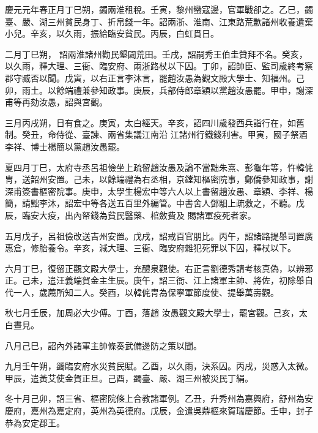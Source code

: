 \begin{pinyinscope}
 慶元元年春正月丁巳朔，蠲兩淮租稅。壬寅，黎州蠻寇邊，官軍戰卻之。乙巳，蠲臺、嚴、湖三州貧民身丁、折帛錢一年。詔兩浙、淮南、江東路荒歉諸州收養遺棄小兒。辛亥，以久雨，振給臨安貧民。丙辰，白虹貫日。



 二月丁巳朔，
 詔兩淮諸州勸民墾闢荒田。壬戌，詔嗣秀王伯圭贊拜不名。癸亥，以久雨，釋大理、三衙、臨安府、兩浙路杖以下囚。丁卯，詔帥臣、監司歲終考察郡守臧否以聞。戊寅，以右正言李沐言，罷趙汝愚為觀文殿大學士、知福州。己卯，雨土。以餘端禮兼參知政事。庚辰，兵部侍郎章穎以黨趙汝愚罷。甲申，謝深甫等再劾汝愚，詔與宮觀。



 三月丙戌朔，日有食之。庚寅，太白經天。辛亥，詔四川歲發西兵詣行在，如舊制。癸丑，命侍從、臺諫、兩省集議江南沿
 江諸州行鐵錢利害。甲寅，國子祭酒李祥、博士楊簡以黨趙汝愚罷。



 夏四月丁巳，太府寺丞呂祖儉坐上疏留趙汝愚及論不當黜朱熹、彭龜年等，忤韓侂冑，送韶州安置。己未，以餘端禮為右丞相，京鏜知樞密院事，鄭僑參知政事，謝深甫簽書樞密院事。庚申，太學生楊宏中等六人以上書留趙汝愚、章穎、李祥、楊簡，請黜李沐，詔宏中等各送五百里外編管。中書舍人鄧馹上疏救之，不聽。戊辰，臨安大疫，出內帑錢為貧民醫藥、棺斂費及
 賜諸軍疫死者家。



 五月戊子，呂祖儉改送吉州安置。戊戌，詔戒百官朋比。丙午，詔諸路提舉司置廣惠倉，修胎養令。辛亥，減大理、三衙、臨安府雜犯死罪以下囚，釋杖以下。



 六月丁巳，復留正觀文殿大學士，充醴泉觀使。右正言劉德秀請考核真偽，以辨邪正。己未，遣汪義端賀金主生辰。庚午，詔三衙、江上諸軍主帥、將佐，初除舉自代一人，歲薦所知二人。癸酉，以韓侂冑為保寧軍節度使、提舉萬壽觀。



 秋七月壬辰，加周必大少傅。丁酉，落趙
 汝愚觀文殿大學士，罷宮觀。己亥，太白晝見。



 八月己巳，詔內外諸軍主帥條奏武備邊防之策以聞。



 九月壬午朔，蠲臨安府水災貧民賦。乙酉，以久雨，決系囚。丙戌，災惑入太微。甲辰，遣黃艾使金賀正旦。己酉，蠲臺、嚴、湖三州被災民丁絹。



 冬十月己卯，詔三省、樞密院條上合教諸軍例。乙丑，升秀州為嘉興府，舒州為安慶府，嘉州為嘉定府，英州為英德府。戊辰，金遣吳鼎樞來賀瑞慶節。壬申，封子恭為安定郡王。




\end{pinyinscope}

